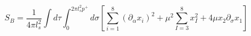 \begin{equation}
 S_B = \frac{1}{4\pi l_s^2} \int d \tau  \int_{0}^{2 \pi l_s^2 p^+} d \sigma
 \left[ \sum_{i=1}^8 (\partial_\alpha x_i)^2  +
 \mu^2 \sum_{I=3}^8 x_I^2 + 4 \mu x_2 \partial_\sigma x_1   \right]
\end{equation}

